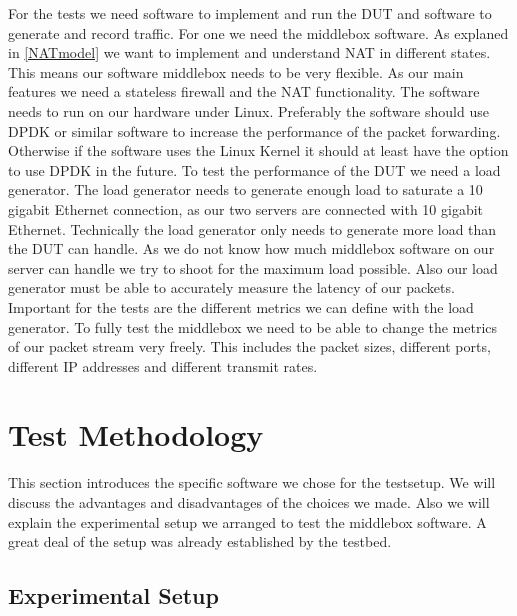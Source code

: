 \documentclass[11pt,a4paper,twoside,openright,bachelor,english]{netthesis}
\begin{document}
For the tests we need software to implement and run the DUT and software to generate and record traffic. For one we need the middlebox software. As explaned in \ref{NATmodel} we want to implement and understand NAT in different states. This means our software middlebox needs to be very flexible. As our main features we need a stateless firewall and the NAT functionality. The software needs to run on our hardware under Linux. Preferably the software should use DPDK or similar software to increase the performance of the packet forwarding. Otherwise if the software uses the Linux Kernel it should at least have the option to use DPDK in the future. To test the performance of the DUT we need a load generator. The load generator needs to generate enough load to saturate a 10 gigabit Ethernet connection, as our two servers are connected with 10 gigabit Ethernet. Technically the load generator only needs to generate more load than the DUT can handle. As we do not know how much middlebox software on our server can handle we try to shoot for the maximum load possible. Also our load generator must be able to accurately measure the latency of our packets. Important for the tests are the different metrics we can define with the load generator. To fully test the middlebox we need to be able to change the metrics of our packet stream very freely. This includes the packet sizes, different ports, different IP addresses and different transmit rates.



\section{Test Methodology}

This section introduces the specific software we chose for the testsetup. We will discuss the advantages and disadvantages of the choices we made. Also we will explain the experimental setup we arranged to test the middlebox software. A great deal of the setup was already established by the testbed. 


\subsection{Experimental Setup}
\end{document}
